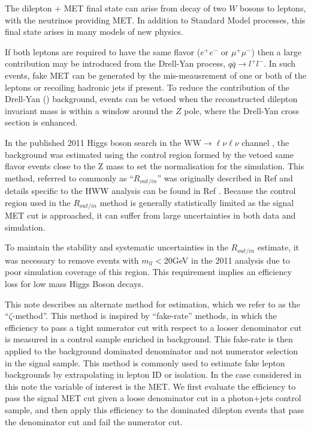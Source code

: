 
The dilepton + MET final state can arise from decay of two $W$ bosons to leptons, with the neutrinos providing MET. In addition to Standard Model processes, this final state arises in many models of new physics.

If both leptons are required to have the same flavor ($e^{+}e^{-}$ or $\mu^{+}\mu^{-}$) then a large contribution may be introduced from the Drell-Yan process, $q\bar{q}\rightarrow l^{+}l^{-}$. In such events, fake MET can be generated by the mis-meausrement of one or both of the leptons or recoiling hadronic jets if present.
To reduce the contribution of the Drell-Yan (\dyll) background, events can be vetoed when the reconstructed dilepton invariant mass is within a window around the $Z$ pole, where the Drell-Yan cross section is enhanced. 

In the published 2011 Higgs boson search in the $\mathrm{WW}\rightarrow\ell\nu\ell\nu$ channel  \cite{ref:hwwsmurfs}, the \dyll background was estimated using the control region formed by the vetoed same flavor events close to the Z mass to set the normalisation for the \dyll simulation.  This method, referred to commonly as ``$R_{out/in}$'' was originally described in Ref \cite{ref:routin} and details specific to the HWW analysis can be found in Ref \cite{ref:hwwsmurfs}.  Because the control region used in the $R_{out/in}$ method is generally statistically limited as the signal MET cut is approached, it can suffer from large uncertainties in both data and simulation.

To maintain the stability and systematic uncertainties in the $R_{out/in}$ estimate, it was necessary to remove events with $m_{ll}<20$GeV in the 2011 analysis due to poor simulation coverage of this region.  This requirement implies an efficiency loss for low mass Higgs Boson decays.

This note describes an alternate method for \dyll estimation, which we refer to as the ``$\zeta$-method''.  This method is inspired by ``fake-rate'' methods, in which the efficiency to pass a tight numerator cut with respect to a looser denominator cut is measured in a control sample enriched in background.  This fake-rate is then applied to the background dominated denominator and not numerator selection in the signal sample.  This method is commonly used to estimate fake lepton backgrounds by extrapolating in lepton ID or isolation.  In the case considered in this note the variable of interest is the MET.  We first evaluate the efficiency to pass the signal MET cut given a loose denominator cut in a photon+jets control sample, and then apply this efficiency to the \dyll dominated dilepton events that pass the denominator cut and fail the numerator cut.
